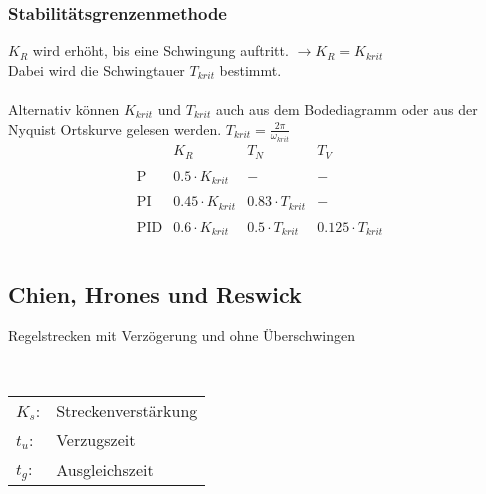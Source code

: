 \subsubsection{Stabilitätsgrenzenmethode}
$K_R$ wird erhöht, bis eine Schwingung auftritt. $\to K_R = K_{krit}$\\
Dabei wird die Schwingtauer $T_{krit}$ bestimmt. \\\\
Alternativ können $K_{krit}$ und $T_{krit}$ auch aus dem Bodediagramm oder 
aus der Nyquist Ortskurve gelesen werden. $T_{krit} = \frac{2 \pi}{\omega_{krit}}$
\[
    \begin{array}{lccc}
        &
            K_R &
            T_N &
            T_V \\\\
        \text{P} &
            0.5 \cdot K_{krit} &
            - &
            - \\\\
        \text{PI} &
            0.45 \cdot K_{krit} &
            0.83 \cdot T_{krit} &
            - \\\\
        \text{PID} &
            0.6 \cdot K_{krit} &
            0.5 \cdot T_{krit} &
            0.125 \cdot T_{krit} \\\\
    \end{array}
\]


\subsection{Chien, Hrones und Reswick}
Regelstrecken mit Verzögerung und ohne Überschwingen
\begin{figure}[h!]
    \centering
\end{figure}
\\
\begin{tabular}{@{}ll}
    $K_s$: & Streckenverstärkung\\
    $t_u$: & Verzugszeit\\
    $t_g$: & Ausgleichszeit\\
\end{tabular}

